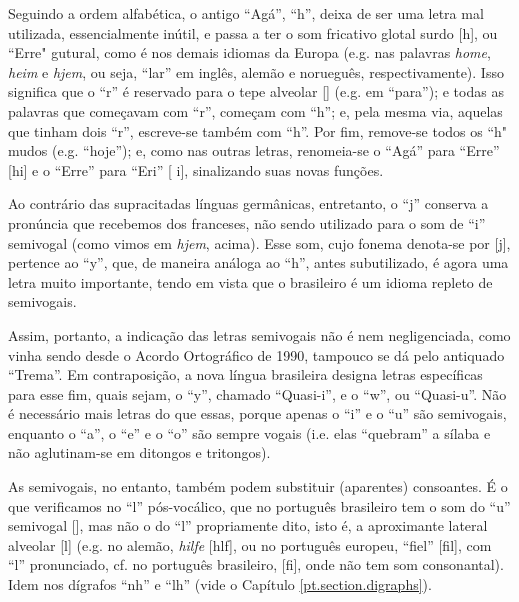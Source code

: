 \documentclass[12pt, a5paper, titlepage]{article}
\begin{document}
\begin{bilingualpages}
    Seguindo a ordem alfabética, o antigo ``Agá'', ``h'', deixa de ser uma letra
    mal utilizada, essencialmente inútil, e passa a ter o som fricativo glotal
    surdo [h], ou ``Erre" gutural, como é nos demais idiomas da Europa (e.g. nas
    palavras \textit{home}, \textit{heim} e \textit{hjem}, ou seja, ``lar'' em
    inglês, alemão e norueguês, respectivamente). Isso significa que o ``r'' é
    reservado para o tepe alveolar [\textfishhookr] (e.g. em ``para''); e todas as
    palavras que começavam com ``r'', começam com ``h''; e, pela mesma via, aquelas
    que tinham dois ``r'', escreve-se também com ``h''. Por fim, remove-se todos os
    ``h" mudos (e.g. ``hoje''); e, como nas outras letras, renomeia-se o ``Agá''
    para ``Erre'' [\textepsilon hi] e o ``Erre'' para ``Eri'' [\textepsilon
    \textfishhookr i], sinalizando suas novas funções.

    Ao contrário das supracitadas línguas germânicas, entretanto, o ``j'' conserva
    a pronúncia que recebemos dos franceses, não sendo utilizado para o som de
    ``i'' semivogal (como vimos em \textit{hjem}, acima). Esse som, cujo fonema
    denota-se por [j], pertence ao ``y'', que, de maneira análoga ao ``h'', antes
    subutilizado, é agora uma letra muito importante, tendo em vista que o
    brasileiro é um idioma repleto de semivogais.

    Assim, portanto, a indicação das letras semivogais não é nem negligenciada,
    como vinha sendo desde o Acordo Ortográfico de 1990, tampouco se dá pelo
    antiquado ``Trema''. Em contraposição, a nova língua brasileira designa letras
    específicas para esse fim, quais sejam, o ``y'', chamado ``Quasi-i'', e o
    ``w'', ou ``Quasi-u''. Não é necessário mais letras do que essas, porque apenas
    o ``i'' e o ``u'' são semivogais, enquanto o ``a'', o ``e'' e o ``o'' são
    sempre vogais (i.e. elas ``quebram'' a sílaba e não aglutinam-se em ditongos e
    tritongos).

    As semivogais, no entanto, também podem substituir (aparentes) consoantes. É o que verificamos no ``l'' pós-vocálico, que no português brasileiro tem o som do ``u'' semivogal [], mas não o do ``l'' propriamente dito, isto é, a aproximante lateral alveolar [l] (e.g. no alemão, \textit{hilfe} [\textprimstress h\textsci lf\textschwa], ou no português europeu, ``fiel'' [fi\textprimstress\textepsilon l], com ``l'' pronunciado, cf. no português brasileiro, [fi\textprimstress {}], onde não tem som consonantal). Idem nos dígrafos ``nh'' e ``lh'' (vide o Capítulo \ref{pt.section.digraphs}).


\end{bilingualpages}
\end{document}
